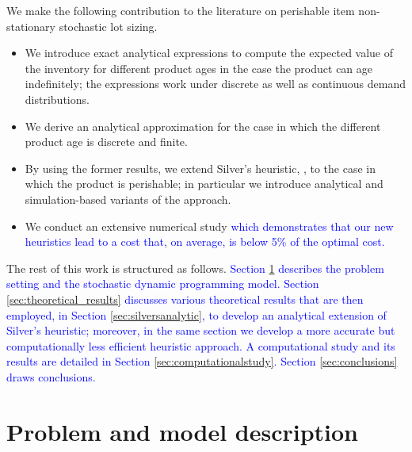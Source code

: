 \documentclass{tPRS2e}
\newcommand{\blue}{\textcolor{blue}}
\begin{document}
	
We make the following contribution to the literature on perishable item non-stationary stochastic lot sizing.
	\begin{itemize}
		\item We introduce exact analytical expressions to compute the expected value of the inventory for different product ages in the case the product can age indefinitely; the expressions work under discrete as well as continuous demand distributions.
		\item We derive an analytical approximation for the case in which the different product age is discrete and finite.
		\item By using the former results, we extend Silver's heuristic, \cite{citeulike:7292564}, to the case in which the product is perishable; in particular we introduce analytical and simulation-based variants of the approach.
		\item We conduct an extensive numerical study \blue{which demonstrates that our new heuristics lead to a cost that, on average, is below 5\% of the optimal cost.}
	\end{itemize}
	
The rest of this work is structured as follows. %
\blue{Section \ref{sec:problemdescription} describes the problem setting and the stochastic dynamic programming model. Section \ref{sec:theoretical_results} discusses various theoretical results that are then employed, in Section \ref{sec:silversanalytic}, to develop an analytical extension of Silver's heuristic; moreover, in the same section we develop a more accurate but computationally less efficient heuristic approach. A computational study and its results are detailed in Section \ref{sec:computationalstudy}. Section \ref{sec:conclusions} draws conclusions.	}




	
	\section{Problem and model description}
	\label{sec:problemdescription}
	
\end{document}
